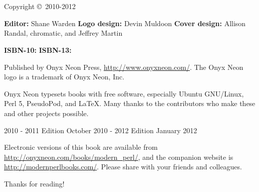 \chapter*{}
\thispagestyle{empty}

\huge{\booktitle}
\newline
\large{\booksubtitle}
\newline
\newline
\normalsize

Copyright \copyright~2010-2012 \bookauthor

\vfill
\textbf{Editor:} Shane Warden\newline
\textbf{Logo design:} Devin Muldoon\newline
\textbf{Cover design:} Allison Randal, chromatic, and Jeffrey Martin

\textbf{ISBN-10:} \bookisbnten\newline
\textbf{ISBN-13:} \bookisbnthirteen

Published by Onyx Neon Press, \url{http://www.onyxneon.com/}.
The Onyx Neon logo is a trademark of Onyx Neon, Inc.

Onyx Neon typesets books with free software, especially Ubuntu GNU/Linux, Perl
5, PseudoPod, and \LaTeX. Many thanks to the contributors who make these and
other projects possible.

2010 - 2011 Edition October 2010 - 2012 Edition January 2012

Electronic versions of this book are available from
\url{http://onyxneon.com/books/modern_perl/}, and the companion website is
\url{http://modernperlbooks.com/}. Please share with your friends and
colleagues.

Thanks for reading!
